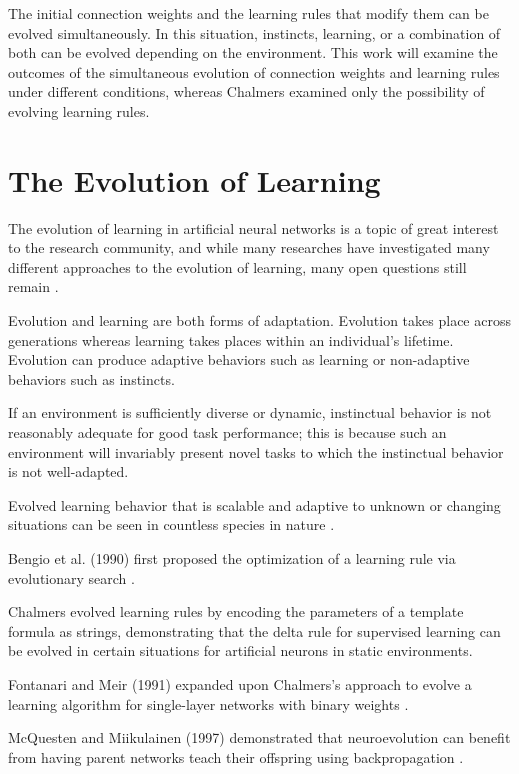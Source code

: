 \documentclass[master]{outhesis}
\begin{document}
The initial connection weights and the learning rules that modify them can be evolved simultaneously.
In this situation, instincts, learning, or a combination of both can be evolved depending on the environment.
This work will examine the outcomes of the simultaneous evolution of connection weights and learning rules under different conditions,
whereas Chalmers examined only the possibility of evolving learning rules.

\section{The Evolution of Learning}

The evolution of learning in artificial neural networks is a topic of great interest to the research community, 
and while many researches have investigated many different approaches to the evolution of learning,
many open questions still remain \cite{Soltoggio:2017bl}.

Evolution and learning are both forms of adaptation.
Evolution takes place across generations whereas learning takes places within an individual's lifetime.
Evolution can produce adaptive behaviors such as learning or non-adaptive behaviors such as instincts.

If an environment is sufficiently diverse or dynamic, instinctual behavior is not reasonably adequate for good task performance;
this is because such an environment will invariably present novel tasks to which the instinctual behavior is not well-adapted.

Evolved learning behavior that is scalable and adaptive to unknown or changing situations can be seen in countless species in nature \cite{Shah:2015hs}.

Bengio et al. (1990) first proposed the optimization of a learning rule via evolutionary search \cite{Bengio:1990aa}.

Chalmers \cite{chalmers-evolution-learning} evolved learning rules by encoding the parameters of a template formula as strings, demonstrating that the delta rule for supervised learning can be evolved in certain situations for artificial neurons in static environments.

Fontanari and Meir (1991) expanded upon Chalmers's approach to evolve a learning algorithm for single-layer networks with binary weights \cite{Fontanari:1991aa}.

McQuesten and Miikulainen (1997) demonstrated that neuroevolution can benefit from having parent networks teach their offspring using backpropagation \cite{McQuesten:1997aa}.
\end{document}
